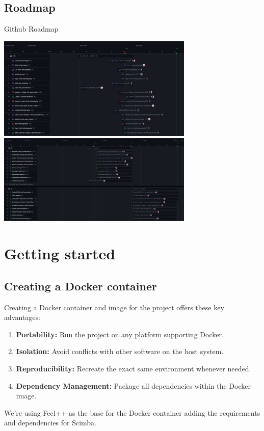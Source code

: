 \documentclass{article}
\begin{document}
\subsection{Roadmap}
\begin{frame}{Github Roadmap}
    \begin{center}
        \includegraphics[width=0.7\textwidth]{images/roadmap1.png}
        \vspace{1em} %
        \includegraphics[width=0.7\textwidth]{images/roadmap2.png}
    \end{center}
\end{frame}


\section{Getting started}
\subsection{Creating a Docker container}
Creating a Docker container and image for the project offers these key advantages:
\begin{enumerate}
 \item \textbf{Portability:} Run the project on any platform supporting Docker.
 \item \textbf{Isolation:} Avoid conflicts with other software on the host system.
 \item \textbf{Reproducibility:} Recreate the exact same environment whenever needed.
 \item \textbf{Dependency Management:} Package all dependencies within the Docker image.


\end{enumerate}
We're using Feel++ as the base for the Docker container adding the requirements and dependencies for Scimba.
\end{document}

